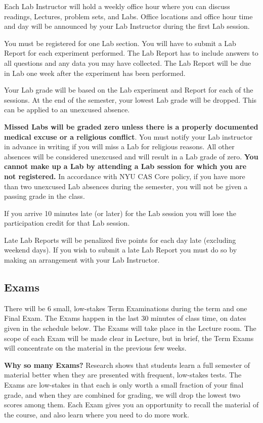 \documentclass[12pt, letterpaper]{article}
\begin{document}
Each Lab Instructor will hold a weekly office hour where you can
discuss readings, Lectures, problem sets, and Labs.
Office locations and office hour time and day will be announced by
your Lab Instructor during the first Lab session.

You must be
registered for one Lab section. You will have to submit a Lab Report
for each experiment performed. The Lab Report has to include answers
to all questions and any data you may have collected. The Lab Report
will be due in Lab one week after the experiment has been performed.

Your Lab grade will be based on the Lab experiment and Report
for each of the sessions.  At the end of the semester, your lowest Lab
grade will be dropped. This can be applied to an unexcused absence.

\textbf{Missed Labs will be graded zero unless there is a properly
  documented medical excuse or a religious conflict}. You must notify
your Lab instructor in advance in writing if you will miss a Lab for
religious reasons. All other absences will be considered unexcused and
will result in a Lab grade of zero. \textbf{You cannot make up a Lab by
attending a Lab session for which you are not registered.}
In accordance with NYU CAS Core policy, if you have more than two
unexcused Lab absences during the semester, you will not be given a
passing grade in the class.

If you arrive 10 minutes late (or later) for the Lab session you will
lose the participation credit for that Lab session.

Late Lab Reports will be penalized five points for each day late
(excluding weekend days). If you wish to submit a late Lab Report you
must do so by making an arrangement with your Lab Instructor.

\subsection*{Exams}

There will be 6 small, low-stakes Term Examinations during the term
and one Final Exam. The Exams happen in the last 30 minutes of class
time, on dates given in the schedule below. The Exams will take place
in the Lecture room. The scope of each Exam will be made clear in
Lecture, but in brief, the Term Exams will concentrate on the material
in the previous few weeks.

\textbf{Why so many Exams?} Research shows that students learn a full
semester of material better when they are presented with frequent,
low-stakes tests. The Exams are low-stakes in that each is only worth
a small fraction of your final grade, and when they are combined for
grading, we will drop the lowest two scores among them. Each Exam
gives you an opportunity to recall the material of the course, and
also learn where you need to do more work.
\end{document}
